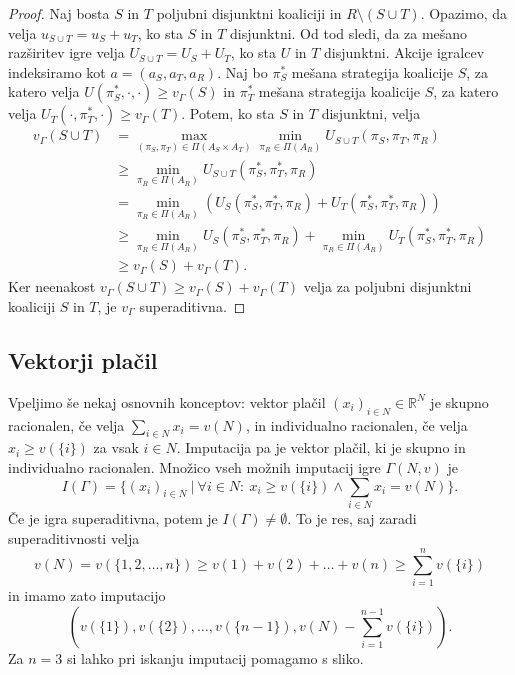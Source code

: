 \documentclass[10pt, a4paper]{article}
\newenvironment{noticeC}{%
  \tcolorbox[%
  notitle,
  empty,
  enhanced,  %
  breakable,
  coltext=black, 
  fontupper=\rmfamily,
  noparskip,
  sharp corners,
  boxrule=-1pt,  %
  frame hidden,
  left=7pt,  %
  right=7pt,
  top=5pt,
  bottom=5pt,
  before skip=2.5ex plus 2pt,
  after skip=2.5ex plus 2pt,
  overlay unbroken and last={%
  },
  ]}
{\endtcolorbox}
\newenvironment{dokaz}%
  {\begin{noticeC}\begin{proof}}%
  {\end{proof}\end{noticeC}}
\newcommand{\R}{\mathbb {R}}
\begin{document}
\begin{dokaz}
  Naj bosta $S$ in $T$ poljubni disjunktni koaliciji in $R \setminus (S \cup T)$.
  Opazimo, da velja $u_{S \cup T} = u_S + u_T$, ko sta $S$ in $T$ disjunktni.
  Od tod sledi, da za mešano razširitev igre velja $U_{S \cup T} = U_S + U_T$,
  ko sta $U$ in $T$ disjunktni.
  Akcije igralcev indeksiramo kot $a = (a_S, a_T, a_R)$.
  Naj bo $\pi_S ^*$ mešana strategija koalicije $S$, za katero velja $U(\pi_S^*, \cdot, \cdot) \geq v_\Gamma (S)$
  in $\pi_T^*$ mešana strategija koalicije $S$, za katero velja $U_T(\cdot, \pi_T^*, \cdot) \geq v_\Gamma (T)$.
  Potem, ko sta $S$ in $T$ disjunktni, velja 
  \begin{align*}
    v_\Gamma (S \cup T) &= \max_{(\pi_S, \pi_T) \in \Pi(A_S \times A_T)} \min_{\pi_R \in \Pi(A_R)} U_{S \cup T} (\pi_S, \pi_T, \pi_R)\\
    &\geq \min_{\pi_R \in \Pi(A_R)} U_{S \cup T} (\pi_S^*, \pi_T^*, \pi_R)\\
    &= \min_{\pi_R \in \Pi(A_R)} \left(U_S (\pi_S^*, \pi_T^*, \pi_R) + U_T (\pi_S^*, \pi_T^*, \pi_R)\right)\\
    &\geq \min_{\pi_R \in \Pi(A_R)} U_S (\pi_S^*, \pi_T^*, \pi_R) + \min_{\pi_R \in \Pi(A_R)} U_T (\pi_S^*, \pi_T^*, \pi_R)\\
    &\geq v_\Gamma(S) + v_\Gamma(T).
  \end{align*}
  Ker neenakost $v_\Gamma(S \cup T) \geq v_\Gamma (S) + v_\Gamma(T)$ velja za poljubni disjunktni koaliciji $S$ in $T$,
  je $v_\Gamma$ superaditivna.
\end{dokaz}

\subsection{Vektorji plačil}

Vpeljimo še nekaj osnovnih konceptov: vektor plačil $(x_i)_{i \in N} \in \R^N$
je skupno racionalen, če velja $\sum_{i \in N} x_i = v(N)$, in individualno racionalen,
če velja $x_i \geq v(\{i\})$ za vsak $i \in N$.
Imputacija pa je vektor plačil, ki je skupno in individualno racionalen.
Množico vseh možnih imputacij igre $\Gamma(N, v)$ je 
$$I(\Gamma) = \{(x_i)_{i \in N}\ |\ \forall i \in N:\ x_i \geq v(\{i\}) \wedge \sum_{i \in N} x_i = v(N)\}.$$
Če je igra superaditivna, potem je $I(\Gamma) \neq \emptyset$.
To je res, saj zaradi superaditivnosti velja 
$$v(N) = v(\{1, 2, \dots, n\}) \geq v(1) + v(2) + \dots + v(n) \geq \sum_{i = 1} ^n v(\{i\})$$
in imamo zato imputacijo
$$\left(v(\{1\}), v(\{2\}),\dots, v(\{n - 1\}), v(N) - \sum_{i = 1} ^{n - 1} v(\{i\}) \right).$$ 
Za $n = 3$ si lahko pri iskanju imputacij pomagamo s sliko.
\end{document}

